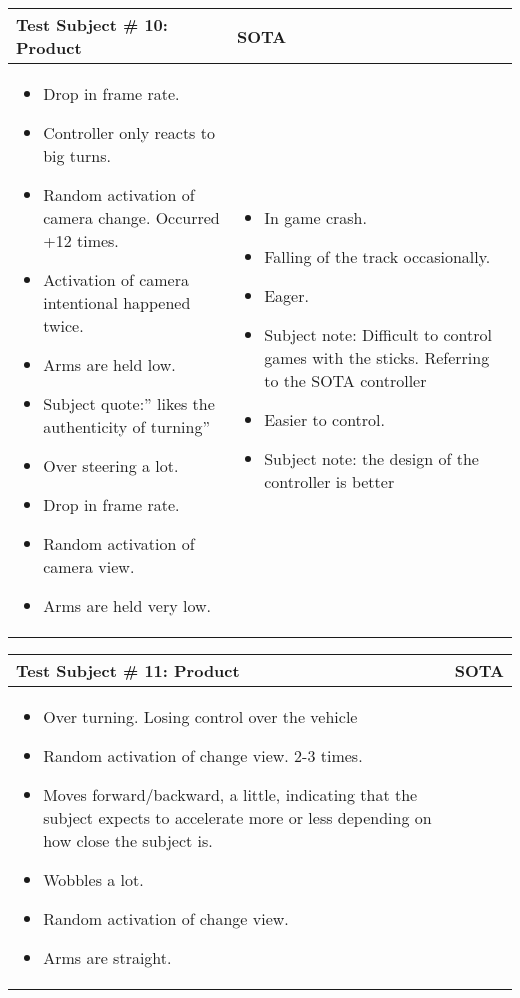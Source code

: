 \begin{table}[!htbp]
\centering
\begin{tabular}{| p{3.4in} | p{2in} |}
\hline
	\textbf{Test Subject \# 10: Product} & \textbf{SOTA}\\
\hline
	\begin{itemize}
		\item Drop in frame rate.
		\item Controller only reacts to big turns.
		\item Random activation of camera change. Occurred +12 times.
		\item Activation of camera intentional happened twice.
		\item Arms are held low.
		\item Subject quote:” likes the authenticity of turning”
		\item Over steering a lot.
		\item Drop in frame rate.
		\item Random activation of camera view.
		\item Arms are held very low.
	\end{itemize}
	&
	\begin{itemize}
		\item In game crash.
		\item Falling of the track occasionally.
		\item Eager.
		\item Subject note: Difficult to control games with the sticks. Referring to the SOTA controller
		\item Easier to control.
		\item Subject note: the design of the controller is better
	\end{itemize}
	\\
\hline
\end{tabular}
\end{table}


\begin{table}[!htbp]
\centering
\begin{tabular}{| p{3.4in} | p{2in} |}
\hline
	\textbf{Test Subject \# 11: Product} & \textbf{SOTA}\\
\hline
	\begin{itemize}
		\item Over turning. Losing control over the vehicle
		\item Random activation of change view. 2-3 times.
		\item Moves forward/backward, a little, indicating that the subject expects to accelerate more or less depending on how close the subject is.
		\item Wobbles a lot.
		\item Random activation of change view.
		\item Arms are straight.
	\end{itemize}
	&

	\\
\hline
\end{tabular}
\end{table}


